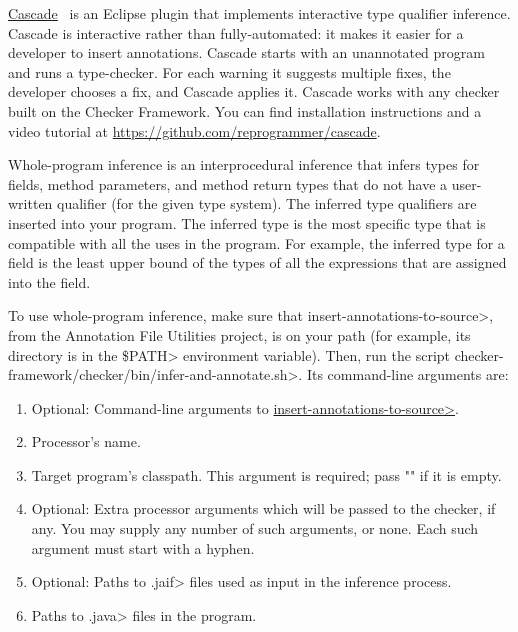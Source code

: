 \href{https://github.com/reprogrammer/cascade/}{Cascade}~\cite{VakilianPEJ2014}
is an Eclipse plugin that implements interactive type qualifier inference.
Cascade is interactive rather than fully-automated:  it makes it easier for
a developer to insert annotations.
Cascade starts with an unannotated program and runs a type-checker.  For each
warning it suggests multiple fixes, the developer chooses a fix, and
Cascade applies it.  Cascade works with any checker built on the Checker
Framework.
You can find installation instructions and a video tutorial at \url{https://github.com/reprogrammer/cascade}.



Whole-program inference is an interprocedural inference that
infers types for fields, method parameters, and method return types that do not
have a user-written qualifier (for the given type system).
The inferred type qualifiers are inserted into
your program.
The inferred type is the most specific type that is compatible with all the
uses in the program.  For example, the inferred type for a field is the
least upper bound of the types of all the expressions that are assigned
into the field.

\begin{sloppypar}
To use whole-program inference, make sure that
\<insert-annotations-to-source>, from the Annotation File Utilities project,
is on your path (for example, its directory is in the \<\$PATH> environment variable).
Then, run the script \<checker-framework/checker/bin/infer-and-annotate.sh>.
Its command-line arguments are:
\end{sloppypar}

\begin{enumerate}
\item Optional: Command-line arguments to
  \href{https://checkerframework.org/annotation-file-utilities/#insert-annotations-to-source}{\<insert-annotations-to-source>}.
\item Processor's name.
\item Target program's classpath.  This argument is required; pass "" if it
  is empty.
\item Optional: Extra processor arguments which will be passed to the checker, if any.
  You may supply any number of such arguments, or none.  Each such argument
  must start with a hyphen.
\item Optional: Paths to \<.jaif> files used as input in the inference
    process.
\item Paths to \<.java> files in the program.
\end{enumerate}

